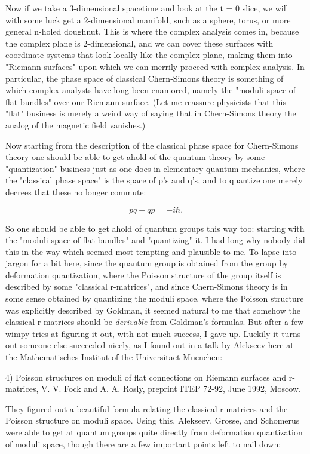 Now if we take a 3-dimensional spacetime and look at the t = 0
slice, we will with some luck get a 2-dimensional manifold, such
as a sphere, torus, or more general n-holed doughnut.  This is where
the complex analysis comes in, because the complex plane is 2-dimensional,
and we can cover these surfaces with coordinate systems that look
locally like the complex plane, making them into "Riemann surfaces"
upon which we can merrily proceed with complex analysis.  In particular,
the phase space of classical Chern-Simons theory is something of
which complex analysts have long been enamored, namely the "moduli
space of flat bundles" over our Riemann surface.  (Let me reassure
physicists that this "flat" business is merely a weird way of saying
that in Chern-Simons theory the analog of the magnetic field vanishes.)

Now starting from the description of the classical phase space for
Chern-Simons theory one should be able to get ahold of the quantum
theory by some "quantization" business just as one does in elementary
quantum mechanics, where the "classical phase space" is the space
of p's and q's, and to quantize one merely decrees that these no
longer commute:

$$
                        pq - qp = -i \hbar .
$$
    

So one should be able to get ahold of quantum groups this way too:
starting with the "moduli space of flat bundles" and "quantizing" it.
I had long why nobody did this in the way which seemed most tempting
and plausible to me.  To lapse into jargon for a bit here, since the
quantum group is obtained from the group by deformation quantization,
where the Poisson structure of the group itself is described by some
"classical r-matrices", and since Chern-Simons theory is in some sense
obtained by quantizing the moduli space, where the Poisson structure
was explicitly described by Goldman, it seemed natural to me that
somehow the classical r-matrices should be \emph{derivable} from Goldman's
formulas.  But after a few wimpy tries at figuring it out, with
not much success, I gave up.  Luckily it turns out someone else 
succeeded nicely, as I found out in a talk by Alekseev here at the
Mathematisches Institut of the Universitaet Muenchen:

4) Poisson structures on moduli of flat connections on Riemann
surfaces and r-matrices, V. V. Fock and A. A. Rosly, preprint ITEP 72-92,
June 1992, Moscow.

They figured out a beautiful formula relating the classical r-matrices
and the Poisson structure on moduli space.  Using this, Alekseev, 
Grosse, and Schomerus were able to get at quantum groups quite
directly from deformation quantization of moduli space, though
there are a few important points left to nail down:

